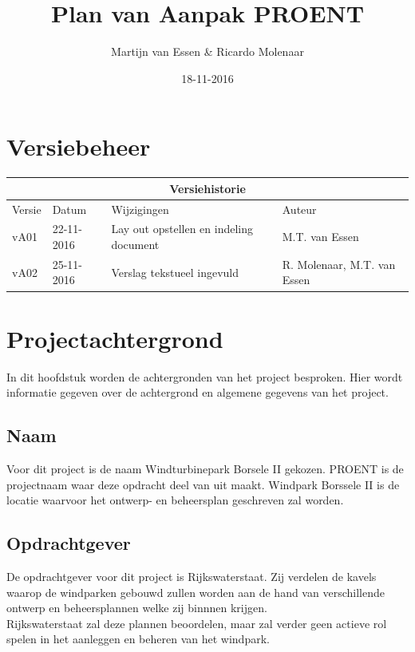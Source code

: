 \documentclass[numbers=endperiod]{scrartcl}
\title{Plan van Aanpak PROENT}
\date{18-11-2016}
\author{Martijn van Essen \& Ricardo Molenaar}
\newcommand{\sectionSmall}[1]{
	\vspace{-10pt}
	\section{#1}
	\vspace{-5pt}
}
\newcommand{\whitespace}{\vspace*{2 mm} \\}%
\begin{document}
	
	\newpage
	
	\setcounter{secnumdepth}{0} %
	\sectionSmall{Versiebeheer}
	
	\begin{center}
		\begin{tabular}{| p{4cm} | l | p{7cm} | p{25mm} |}
			\hline
			
			\multicolumn{4}{|c|}{
				\cellcolor{hhs_theme_heading_2}
				Versiehistorie
			}  \\ \hline
			
			Versie 	& Datum 		& Wijzigingen 	& Auteur \\ \hline
			vA01 	& 22-11-2016 	& Lay out opstellen en indeling document    & M.T. van Essen\\ \hline
			vA02    & 25-11-2016    & Verslag tekstueel ingevuld                & R. Molenaar, M.T. van Essen \\ \hline
		\end{tabular}
	\end{center}
	\newpage
	
	\setcounter{tocdepth}{2}%
	\tableofcontents
	\newpage
	
	\setcounter{secnumdepth}{3}%
	
	\sectionSmall{Projectachtergrond}
	In dit hoofdstuk worden de achtergronden van het project besproken. Hier wordt informatie gegeven over de achtergrond en algemene gegevens van het project.	
	\subsection{Naam}
	Voor dit project is de naam Windturbinepark Borsele II gekozen. PROENT is de projectnaam waar deze opdracht deel van uit maakt. Windpark Borssele II is de locatie waarvoor het ontwerp- en beheersplan geschreven zal worden.
	\subsection{Opdrachtgever}
	De opdrachtgever voor dit project is Rijkswaterstaat. Zij verdelen de kavels waarop de windparken gebouwd zullen worden aan de hand van verschillende ontwerp en beheersplannen welke zij binnnen krijgen.
	\whitespace
	Rijkswaterstaat zal deze plannen beoordelen, maar zal verder geen actieve rol spelen in het aanleggen en beheren van het windpark.
\end{document}
